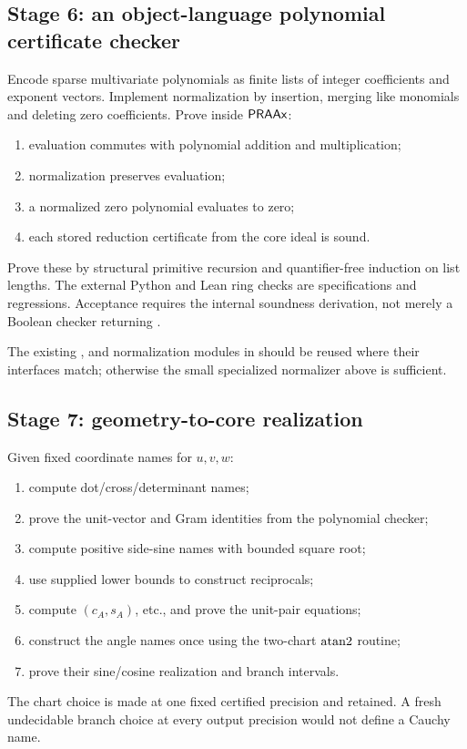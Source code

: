 \subsection{Stage 6: an object-language polynomial certificate checker}

Encode sparse multivariate polynomials as finite lists of integer coefficients
and exponent vectors.  Implement normalization by insertion, merging like
monomials and deleting zero coefficients.  Prove inside \(\mathsf{PRAAx}\):
\begin{enumerate}
\item evaluation commutes with polynomial addition and multiplication;
\item normalization preserves evaluation;
\item a normalized zero polynomial evaluates to zero;
\item each stored reduction certificate from the core ideal is sound.
\end{enumerate}
Prove these by structural primitive recursion and quantifier-free induction on
list lengths.  The external Python and Lean ring checks are specifications and
regressions.  Acceptance requires the internal soundness derivation, not merely
a Boolean checker returning .

The existing ,  and normalization modules in
 should be reused where their interfaces match; otherwise the
small specialized normalizer above is sufficient.

\subsection{Stage 7: geometry-to-core realization}

Given fixed coordinate names for \(u,v,w\):
\begin{enumerate}
\item compute dot/cross/determinant names;
\item prove the unit-vector and Gram identities from the polynomial checker;
\item compute positive side-sine names with bounded square root;
\item use supplied lower bounds to construct reciprocals;
\item compute \((c_A,s_A)\), etc., and prove the unit-pair equations;
\item construct the angle names once using the two-chart \(\operatorname{atan2}\) routine;
\item prove their sine/cosine realization and branch intervals.
\end{enumerate}
The chart choice is made at one fixed certified precision and retained.  A
fresh undecidable branch choice at every output precision would not define a
Cauchy name.

